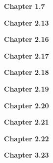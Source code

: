 \documentclass[12pt,letterpaper]{article}
\begin{document}
\textbf{Chapter 1.7} \label{sec:chapter1.7}

%
\textbf{Chapter 2.13} \label{sec:chapter2.13}

\textbf{Chapter 2.16} \label{sec:chapter2.16}

\textbf{Chapter 2.17} \label{sec:chapter2.17}

\textbf{Chapter 2.18} \label{sec:chapter2.18}

\textbf{Chapter 2.19} \label{sec:chapter2.19}

\textbf{Chapter 2.20} \label{sec:chapter2.20}

\textbf{Chapter 2.21} \label{sec:chapter2.21}

\textbf{Chapter 2.22} \label{sec:chapter2.22}

\textbf{Chapter 3.23} \label{sec:chapter3.23}

\end{document}
